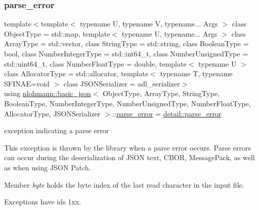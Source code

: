 \subsubsection{\texorpdfstring{parse\+\_\+error}{parse\_error}}
{\footnotesize\ttfamily template$<$template$<$ typename U, typename V, typename... Args $>$ class Object\+Type = std\+::map, template$<$ typename U, typename... Args $>$ class Array\+Type = std\+::vector, class String\+Type  = std\+::string, class Boolean\+Type  = bool, class Number\+Integer\+Type  = std\+::int64\+\_\+t, class Number\+Unsigned\+Type  = std\+::uint64\+\_\+t, class Number\+Float\+Type  = double, template$<$ typename U $>$ class Allocator\+Type = std\+::allocator, template$<$ typename T, typename S\+F\+I\+N\+A\+E=void $>$ class J\+S\+O\+N\+Serializer = adl\+\_\+serializer$>$ \\
using \mbox{\hyperlink{classnlohmann_1_1basic__json}{nlohmann\+::basic\+\_\+json}}$<$ Object\+Type, Array\+Type, String\+Type, Boolean\+Type, Number\+Integer\+Type, Number\+Unsigned\+Type, Number\+Float\+Type, Allocator\+Type, J\+S\+O\+N\+Serializer $>$\+::\mbox{\hyperlink{classnlohmann_1_1basic__json_af1efc2468e6022be6e35fc2944cabe4d}{parse\+\_\+error}} =  \mbox{\hyperlink{classnlohmann_1_1detail_1_1parse__error}{detail\+::parse\+\_\+error}}}



exception indicating a parse error 

This exception is thrown by the library when a parse error occurs. Parse errors can occur during the deserialization of J\+S\+ON text, C\+B\+OR, Message\+Pack, as well as when using J\+S\+ON Patch.

Member {\itshape byte} holds the byte index of the last read character in the input file.

Exceptions have ids 1xx.

